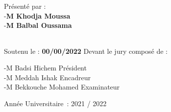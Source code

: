\begin{titlepage}
\begin{center}
        \vspace{0.5cm}
        
        Présenté par : \\
        -\textbf{M Khodja Moussa} \\
        -\textbf{M Balbal Oussama} \\\

        
        \vspace{0.5cm}

        Soutenu le : \textbf{00/00/2022} Devant le jury composé de :\\
    \end{center}
        -M  Badsi Hichem Président \\
        -M  Meddah Ishak Encadreur \\
        -M  Bekkouche Mohamed Examinateur \\
    
    \begin{center}
        \vfill
        Année Universitaire : 2021 / 2022
    \end{center}
\end{titlepage}
